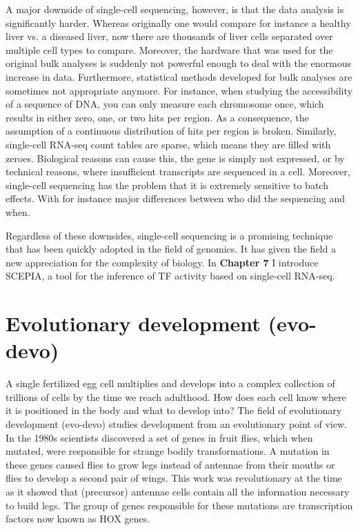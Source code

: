 A major downside of single-cell sequencing, however, is that the data analysis is significantly harder. Whereas originally one would compare for instance a healthy liver vs. a diseased liver, now there are thousands of liver cells separated over multiple cell types to compare. Moreover, the hardware that was used for the original bulk analyses is suddenly not powerful enough to deal with the enormous increase in data. Furthermore, statistical methods developed for bulk analyses are sometimes not appropriate anymore. For instance, when studying the accessibility of a sequence of DNA, you can only measure each chromosome once, which results in either zero, one, or two hits per region. As a consequence, the assumption of a continuous distribution of hits per region is broken. Similarly, single-cell RNA-seq count tables are sparse, which means they are filled with zeroes. Biological reasons can cause this, the gene is simply not expressed, or by technical reasons, where insufficient transcripts are sequenced in a cell\cite{Jiang2022}. Moreover, single-cell sequencing has the problem that it is extremely sensitive to batch effects. With for instance major differences between who did the sequencing and when.

Regardless of these downsides, single-cell sequencing is a promising technique that has been quickly adopted in the field of genomics. It has given the field a new appreciation for the complexity of biology. In \textbf{Chapter 7} I introduce SCEPIA, a tool for the inference of TF activity based on single-cell RNA-seq.

\section{Evolutionary development (evo-devo)}

A single fertilized egg cell multiplies and develops into a complex collection of trillions of cells by the time we reach adulthood. How does each cell know where it is positioned in the body and what to develop into? The field of evolutionary development (evo-devo) studies development from an evolutionary point of view. In the 1980s scientists discovered a set of genes in fruit flies, which when mutated, were responsible for strange bodily transformations. A mutation in these genes caused flies to grow legs instead of antennae from their mouths\cite{Schneuwly1987} or flies to develop a second pair of wings\cite{Weatherbee1998}. This work was revolutionary at the time as it showed that (precursor) antennae cells contain all the information necessary to build legs. The group of genes responsible for these mutations are transcription factors now known as HOX genes.

